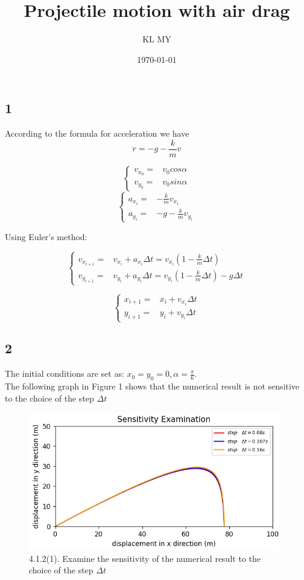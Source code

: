 \documentclass{article}
\title{Projectile motion with air drag}
\author{KL MY}
\date{\today}
\begin{document}
\maketitle

\subsection*{1}
According to the formula for acceleration we have
$$
\ddot{r}=-g-\frac{k}{m}v
$$

$$
\begin{cases}
    v_{x_{0}}= & v_{0}cos\alpha \\

    v_{y_{0}}= & v_{0}sin\alpha
\end{cases}
$$
$$
  \begin{cases}
    a_{x_{i}}= & -\frac{k}{m}v_{x_{i}}   \\

    a_{y_{i}}= & -g-\frac{k}{m}v_{y_{i}}
  \end{cases}
$$

Using Euler's method:

$$
  \begin{cases}
    v_{x_{i+1}}= & v_{x_{i}}+a_{x_{i}}\Delta t = v_{x_{i}}(1-\frac{k}{m}\Delta t)           \\

    v_{y_{i+1}}= & v_{y_{i}}+a_{y_{i}}\Delta t = v_{y_{i}}(1-\frac{k}{m}\Delta t)-g\Delta t
  \end{cases}
$$

$$
  \begin{cases}
    x_{i+1}= & x_{i}+v_{x_{i}}\Delta t \\

    y_{i+1}= & y_{i}+v_{y_{i}}\Delta t
  \end{cases}
$$

\subsection*{2}

The initial conditions are set as: $x_{0}=y_{0}=0, \alpha =\frac{\pi}{6}$. \\

The following graph in Figure 1 shows that the numerical result is not sensitive to the choice of the step {$\Delta t$}

\begin{figure}[H]
  \centering
  \includegraphics[width=11cm,height=6cm]{./graphs/project4.1.2(4).png}
  \caption{4.1.2(1). Examine the sensitivity of the numerical result to the choice of the step $\Delta t$}
\end{figure}
\end{document}
